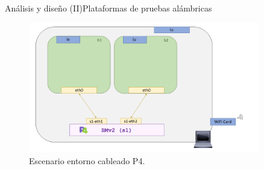 \documentclass[10pt,compress,xcolor=table]{beamer} %
\begin{document}
\begin{frame}{Análisis y diseño (II)}{Plataformas de pruebas alámbricas}
\begin{figure}
  \includegraphics[width=0.9\textwidth]{img/3.png}
  \caption{Escenario entorno cableado P4.}
  \label{fig:cableados2}
\end{figure}
\end{frame}

\end{document}
